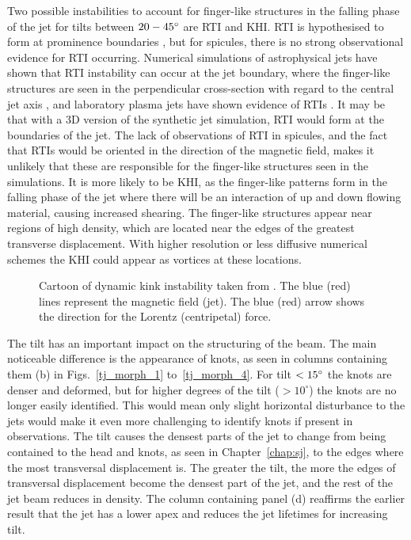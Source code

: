 Two possible instabilities to account for finger-like structures in the falling phase of the jet for tilts between $20-45^{\circ}$ are RTI and KHI. RTI is hypothesised to form at prominence boundaries \citep{Berger2008ApJ676L89B,Berger2010ApJ7161288B,Hillier2012ApJ746120H,Berger2017ApJ85060B}, but for spicules, there is no strong observational evidence for RTI occurring. Numerical simulations of astrophysical jets have shown that RTI instability can occur at the jet boundary, where the finger-like structures are seen in the perpendicular cross-section with regard to the central jet axis \citep{Toma2017MNRAS4721253T,Matsumoto2017MNRAS4721421M}, and laboratory plasma jets have shown evidence of RTIs \citep{Zhai2016PhPl23c2121Z}. It may be that with a 3D version of the synthetic jet simulation, RTI would form at the boundaries of the jet. The lack of observations of RTI in spicules, and the fact that RTIs would be oriented in the direction of the magnetic field, makes it unlikely that these are responsible for the finger-like structures seen in the simulations. It is more likely to be KHI, as the finger-like patterns form in the falling phase of the jet where there will be an interaction of up and down flowing material, causing increased shearing. The finger-like structures appear near regions of high density, which are located near the edges of the greatest transverse displacement. With higher resolution or less diffusive numerical schemes the KHI could appear as vortices at these locations. \np
%
\begin{figure}
\captionsetup[subfigure]{labelformat=empty}
\centering
{}
\caption{Cartoon of dynamic kink instability taken from \cite{Zaqarashvili2020ApJ893L46Z}. The blue (red) lines represent the magnetic field (jet). The blue (red) arrow shows the direction for the Lorentz (centripetal) force.}
\label{DKI_example}
\end{figure}
The tilt has an important impact on the structuring of the beam. The main noticeable difference is the appearance of knots, as seen in columns containing them (b) in Figs.~\ref{tj_morph_1} to~\ref{tj_morph_4}. For tilt $<15^{\circ}$ the knots are denser and deformed, but for higher degrees of the tilt ($> 10^{\circ}$) the knots are no longer easily identified. This would mean only slight horizontal disturbance to the jets would make it even more challenging to identify knots if present in observations. The tilt causes the densest parts of the jet to change from being contained to the head and knots, as seen in Chapter~\ref{chap:sj}, to the edges where the most transversal displacement is. The greater the tilt, the more the edges of transversal displacement become the densest part of the jet, and the rest of the jet beam reduces in density. The column containing panel (d) reaffirms the earlier result that the jet has a lower apex and reduces the jet lifetimes for increasing tilt.
